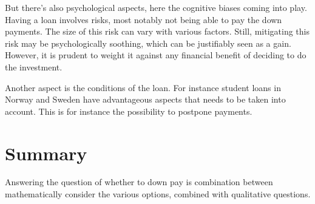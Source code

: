 \documentclass[a4paper]{article}
\begin{document}
But there's also psychological aspects, here the cognitive biases coming into
play. Having a loan involves risks, most notably not being able to pay the
down payments. The size of this risk can vary with various factors. Still,
mitigating this risk may be psychologically soothing, which can be justifiably
seen as a gain. However, it is prudent to weight it against any financial
benefit of deciding to do the investment.

Another aspect is the conditions of the loan. For instance student loans in
Norway and Sweden have advantageous aspects that needs to be taken into account.
This is for instance the possibility to postpone payments.

\section{Summary}

Answering the question of whether to down pay is combination between
mathematically consider the various options, combined with qualitative
questions.
\end{document}
